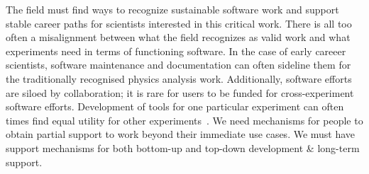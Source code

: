The field must find ways to recognize sustainable software work and support stable career paths for scientists interested in this critical work. There is all too often a misalignment between what the field recognizes as valid work and what experiments need in terms of functioning software. In the case of early careeer scientists, software maintenance and documentation can often sideline them for the traditionally recognised physics analysis work. Additionally, software efforts are siloed by collaboration; it is rare for users to be funded for cross-experiment software efforts. Development of tools for one particular experiment can often times find equal utility for other experiments~\cite{Backhouse:2022cgc}. We need mechanisms for people to obtain partial support to work beyond their immediate use cases. We must have support mechanisms for both bottom-up and top-down development \& long-term support.

